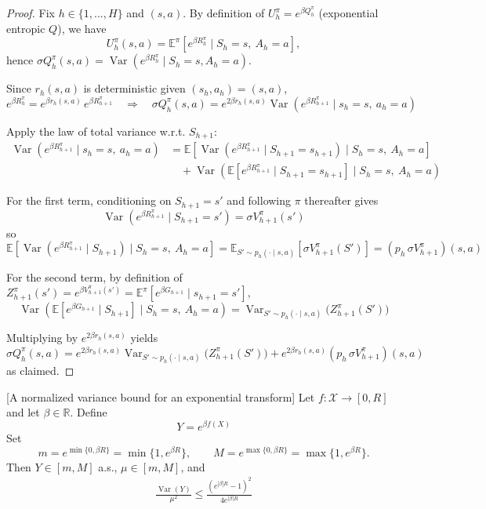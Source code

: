 \documentclass[final,12pt]{colt2026} %
\begin{document}
\begin{proof}
Fix $h\in\{1,...,H\}$ and $(s,a)$.
By definition of $U_h^\pi=e^{\beta Q_h^\pi}$ (exponential entropic $Q$), we have
\[
U_h^\pi(s,a)
=
\mathbb{E}^\pi\left[e^{\beta R_h^\pi}\mid S_h=s,\ A_h=a\right],
\]
hence $\sigma Q_h^\pi(s,a)=\operatorname{Var}\left(e^{\beta R_h^\pi}\mid S_h=s, A_h=a\right)$.

Since $r_h(s,a)$ is deterministic given $(s_h,a_h)=(s,a)$,
\[
e^{\beta R_h^\pi}=e^{\beta r_h(s,a)}\,e^{\beta R_{h+1}^\pi}
\quad\Rightarrow\quad
\sigma Q_h^\pi(s,a)
=
e^{2\beta r_h(s,a)}\operatorname{Var}\left(e^{\beta R_{h+1}^\pi}\mid s_h=s,\ a_h=a\right)
\]

Apply the law of total variance w.r.t. $S_{h+1}$:
\begin{align*}
\operatorname{Var}\left(e^{\beta R^\pi_{h+1}}\mid s_h=s,\ a_h=a\right)
&=
\mathbb{E}\left[\operatorname{Var}\left(e^{\beta R^\pi_{h+1}}\mid S_{h+1} = s_{h+1}\right)\mid S_h=s,\ A_h=a\right]\\
&\quad+
\operatorname{Var}\left(\mathbb{E}\left[e^{\beta R^\pi_{h+1}}\mid S_{h+1} = s_{h+1}\right]\mid S_h=s,\ A_h=a\right)
\end{align*}

For the first term, conditioning on $S_{h+1}=s'$ and following $\pi$ thereafter gives
$$
\operatorname{Var}\left(e^{\beta R^\pi_{h+1}}\mid S_{h+1}=s'\right)=\sigma V_{h+1}^\pi(s')
$$
so
$$
\mathbb{E}\left[\operatorname{Var}\left(e^{\beta R^\pi_{h+1}}\mid S_{h+1}\right)\mid S_h=s,\ A_h=a\right]
=
\mathbb{E}_{S'\sim p_h(\cdot\mid s,a)}\left[\sigma V_{h+1}^\pi(S')\right]
=
(p_h\,\sigma V_{h+1}^\pi)(s,a)
$$

For the second term, by definition of $Z_{h+1}^\pi(s')=e^{\beta V_{h+1}^\pi(s')}
=\mathbb{E}^\pi[e^{\beta G_{h+1}}\mid s_{h+1}=s']$,
$$
\operatorname{Var}\left(\mathbb{E}\left[e^{\beta G_{h+1}}\mid S_{h+1}\right]\mid S_h=s,\ A_h=a\right)
=
\operatorname{Var}_{S'\sim p_h(\cdot\mid s,a)}\Big(Z_{h+1}^\pi(S')\Big)
$$

Multiplying by $e^{2\beta r_h(s,a)}$ yields
$$
\sigma Q_h^\pi(s,a)
=
e^{2\beta r_h(s,a)} \operatorname{Var}_{S'\sim p_h(\cdot\mid s,a)}\Big(Z_{h+1}^\pi(S')\Big)
+
e^{2\beta r_h(s,a)} (p_h\,\sigma V_{h+1}^\pi)(s,a)
$$
as claimed.
\end{proof}
\begin{lemma}\label{bound}[A normalized variance bound for an exponential transform]
Let $f:\mathcal X\to[0,R]$ and let $\beta\in\mathbb R$. Define
$$ Y = e^{\beta f(X)}$$
Set
$$
m = e^{\min\{0,\beta R\}}=\min\{1,e^{\beta R}\},
\qquad
M = e^{\max\{0,\beta R\}}=\max\{1,e^{\beta R}\}.
$$
Then $Y\in[m,M]$ a.s., $\mu\in[m,M]$, and
\begin{align*}
\frac{\operatorname{Var}(Y)}{\mu^2}
 \leq \frac{(e^{|\beta|R}-1)^2}{4e^{|\beta|R}} 
\end{align*}
\end{lemma}
\end{document}
